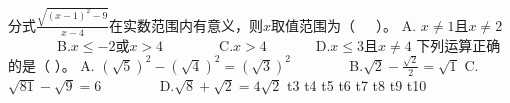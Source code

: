 \markdownRendererDocumentBegin
\markdownRendererOlBeginTight
{}分式$\frac{\sqrt{(x-1)^2-9}}{x-4}$在实数范围内有意义，则$x$取值范围为（~~~）。\markdownRendererOlItemEnd 
\markdownRendererOlEndTight \markdownRendererInterblockSeparator
{}A. $x\neq 1$且$x\neq 2$~~~~~~~B.$x\le-2$或$x>4$~~~~~~~~C.$x>4$~~~~~~~D.$x\le3$且$x\neq4$\markdownRendererInterblockSeparator
{}\markdownRendererOlBeginTight
{}下列运算正确的是（ ）。 A. $(\sqrt{5})^2-(\sqrt{4})^2=(\sqrt{3})^2$ ~~~~~~~ B.$\sqrt{2}-\frac{\sqrt{2}}{2}=\sqrt{1}$\markdownRendererOlItemEnd 
\markdownRendererOlEndTight \markdownRendererInterblockSeparator
{}C. $\sqrt{81}-\sqrt{9}=6$ ~~~~~~~ D.$\sqrt{8}+\sqrt{2}=4\sqrt{2}$\markdownRendererInterblockSeparator
{}\markdownRendererOlBeginTight
{}t3\markdownRendererOlItemEnd 
{}t4\markdownRendererOlItemEnd 
{}t5\markdownRendererOlItemEnd 
{}t6\markdownRendererOlItemEnd 
{}t7\markdownRendererOlItemEnd 
{}t8\markdownRendererOlItemEnd 
{}t9\markdownRendererOlItemEnd 
{}t10\markdownRendererOlItemEnd 
\markdownRendererOlEndTight \markdownRendererDocumentEnd